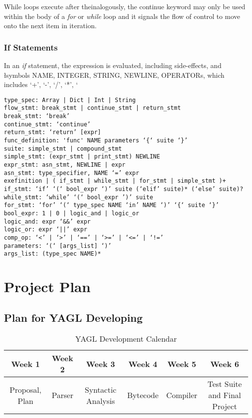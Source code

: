 \documentclass[12pt]{article}
\begin{document}
While loops execute after theinalogously, the continue keyword may only be used within the body of a \textit{for} or \textit{while} loop and it signals the flow of control to move onto the next item in iteration. 

\subsubsection{If Statements}

In an \textit{if} statement, the expression is evaluated, including side-effects, and \l symbols NAME, INTEGER, STRING, NEWLINE, OPERATORs, which includes ‘+’, ‘-’, ‘/’, ‘*’, ‘%

\begin{lstlisting}
type_spec: Array | Dict | Int | String
flow_stmt: break_stmt | continue_stmt | return_stmt
break_stmt: ‘break’
continue_stmt: ‘continue’
return_stmt: ‘return’ [expr]
func_definition: 'func' NAME parameters ‘{‘ suite ‘}’
suite: simple_stmt | compound_stmt
simple_stmt: (expr_stmt | print_stmt) NEWLINE
expr_stmt: asn_stmt, NEWLINE | expr 
asn_stmt: type_specifier, NAME ‘=’ expr
exefinition | ( if_stmt | while_stmt | for_stmt | simple_stmt )+
if_stmt: ‘if’ ‘(‘ bool_expr ‘)’ suite (‘elif’ suite)* (‘else’ suite)?
while_stmt: ‘while’ ‘(‘ bool_expr ’)’ suite
for_stmt: ‘for’ ‘(‘ type_spec NAME ‘in’ NAME ‘)’ ‘{‘ suite ‘}’
bool_expr: 1 | 0 | logic_and | logic_or 
logic_and: expr ‘&&’ expr 
logic_or: expr ‘||’ expr 
comp_op: ‘<’ | ‘>’ | ‘==’ | ‘>=’ | ‘<=’ | ‘!=’
parameters: ‘(‘ [args_list] ‘)’
args_list: (type_spec NAME)*
\end{lstlisting}

\section{Project Plan}
\subsection{Plan for YAGL Developing }
\begin{table}[H]
\caption{YAGL Development Calendar}
\centering
\begin{tabular}{c c c c c c}

\textbf{Week 1} & \textbf{Week 2} & \textbf{Week 3} & \textbf{Week 4} & \textbf{Week 5} & \textbf{Week 6}\\ [0.5ex] %
\hline
Proposal, Plan&Parser&Syntactic Analysis&Bytecode&Compiler&Test Suite and Final Project \\

\hline
\end{tabular}
\end{table}
\end{document}
